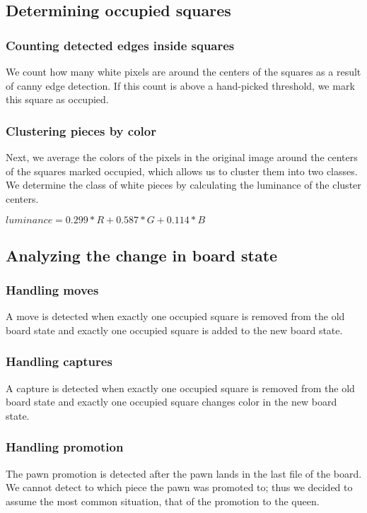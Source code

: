 \documentclass{article}
\begin{document}
\subsection{Determining occupied squares}

\subsubsection{Counting detected edges inside squares}
We count how many white pixels are around the centers of the squares as a result of canny edge detection. If this count is above a hand-picked threshold, we mark this square as occupied.

\subsubsection{Clustering pieces by color}
Next, we average the colors of the pixels in the original image around the centers of the squares marked occupied, which allows us to cluster them into two classes. We determine the class of white pieces by calculating the luminance of the cluster centers.

$luminance = 0.299*R + 0.587*G + 0.114*B$

\subsection{Analyzing the change in board state}

\subsubsection{Handling moves}
A move is detected when exactly one occupied square is removed from the old board state and exactly one occupied square is added to the new board state.

\subsubsection{Handling captures}
A capture is detected when exactly one occupied square is removed from the old board state and exactly one occupied square changes color in the new board state.

\subsubsection{Handling promotion}
The pawn promotion is detected after the pawn lands in the last file of the board. We cannot detect to which piece the pawn was promoted to; thus we decided to assume the most common situation, that of the promotion to the queen.
\end{document}
